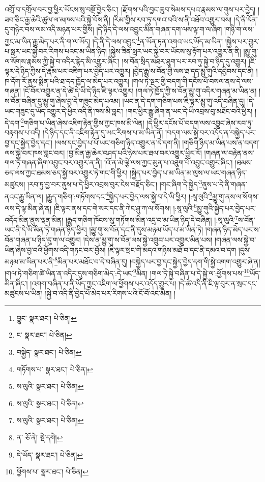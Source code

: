 འགྲོ་བ་དགྲོལ་བར་བྱ་ཕྱིར་ཡོངས་སུ་བསྔོ་བྱེད་ཅིང་། །རྫོགས་པའི་བྱང་ཆུབ་སེམས་དཔའ་རྣམས་ལ་གུས་པར་བྱེད། །ཟབ་ཅིང་རྒྱ་ཆེའི་ཚུལ་ལ་མཁས་པའི་སྐྱེ་བོས་ནི། །རིམ་གྱིས་རབ་ཏུ་དགའ་བའི་ས་ནི་འཐོབ་འགྱུར་བས། །དེ་ནི་དོན་དུ་གཉེར་བས་ལམ་འདི་མཉན་པར་གྱིས། །དེ་ཉིད་དེ་ལས་འབྱུང་མིན་གཞན་དག་ལས་ལྟ་ག་ལ་ཞིག །གཉི་ག་ལས་ཀྱང་མ་ཡིན་རྒྱུ་མེད་པར་ནི་ག་ལ་ཡོད། །དེ་ནི་དེ་ལས་འབྱུང་\footnote{བྱུང་  སྣར་ཐང་།  པེ་ཅིན། }ན་ཡོན་ཏན་འགའ་ཡང་ཡོད་མ་ཡིན། །སྐྱེས་པར་གྱུར་པ་སླར་ཡང་སྐྱེ་བར་རིགས་པའང་མ་ཡིན་ཉིད། །སྐྱེས་ཟིན་སླར་ཡང་སྐྱེ་བར་ཡོངས་སུ་རྟོག་པར་འགྱུར་ན་ནི། །མྱུ་གུ་ལ་སོགས་རྣམས་ཀྱི་སྐྱེ་བ་འདིར་རྙེད་མི་འགྱུར་ཞིང་། །ས་བོན་སྲིད་མཐར་ཐུག་པར་རབ་ཏུ་སྐྱེ་བ་ཉིད་དུ་འགྱུར། །ཇི་ལྟར་དེ་ཉིད་ཀྱིས་དེ་རྣམ་པར་འཇིག་པར་བྱེད་པར་འགྱུར། །བྱེད་རྒྱུ་ས་བོན་གྱི་ལས་ཐ་དད་མྱུ་གུའི་དབྱིབས་དང་ནི། །ཁ་དོག་རོ་ནུས་སྨིན་པའི་ཐ་དད་ཁྱོད་ལ་མེད་པར་འགྱུར། །གལ་ཏེ་སྔར་གྱི་བདག་གི་དངོས་པོ་བསལ་ནས་དེ་ལས་གཞན། །ངོ་བོར་འགྱུར་ན་དེ་ཚེ་དེ་ཡི་དེ་ཉིད་ཇི་ལྟར་འགྱུར། །གལ་ཏེ་ཁྱོད་ཀྱི་ས་བོན་མྱུ་གུ་འདིར་གཞན་མ་ཡིན་ན། །ས་བོན་བཞིན་དུ་མྱུ་གུ་ཞེས་བྱ་དེ་གཟུང་མེད་པའམ། །ཡང་ན་དེ་དག་གཅིག་པས་ཇི་ལྟར་མྱུ་གུ་འདི་བཞིན་དུ། །དེ་ཡང་གཟུང་དུ་ཡོད་འགྱུར་དེ་ཕྱིར་འདི་ནི་ཁས་མི་བླང་། །གང་ཕྱིར་རྒྱུ་ཞིག་ན་ཡང་དེ་ཡི་འབྲས་བུ་མཐོང་བའི་ཕྱིར། །དེ་དག་\footnote{ང་  སྣར་ཐང་།  པེ་ཅིན། }གཅིག་པ་ཡིན་ཞེས་འཇིག་རྟེན་གྱིས་ཀྱང་ཁས་མི་ལེན། །དེ་ཕྱིར་དངོས་པོ་བདག་ལས་འབྱུང་ཞེས་རབ་ཏུ་བརྟགས་པ་འདི། །དེ་ཉིད་དང་ནི་འཇིག་རྟེན་དུ་ཡང་རིགས་པ་མ་ཡིན་ནོ། །བདག་ལས་སྐྱེ་བར་འདོད་ན་བསྐྱེད་པར་བྱ་དང་སྐྱེད་བྱེད་དང་། །ལས་དང་བྱེད་པ་པོ་ཡང་གཅིག་ཉིད་འགྱུར་ན་དེ་དག་ནི། །གཅིག་ཉིད་མ་ཡིན་པས་ན་བདག་ལས་སྐྱེ་བར་ཁས་བླང་བར། །བྱ་མིན་རྒྱ་ཆེར་བཤད་པའི་ཉེས་པར་ཐལ་བར་འགྱུར་ཕྱིར་རོ། །གཞན་ལ་བརྟེན་ནས་གལ་ཏེ་གཞན་ཞིག་འབྱུང་བར་འགྱུར་ན་ནི། །འོ་ན་མེ་ལྕེ་ལས་ཀྱང་མུན་པ་འཐུག་པོ་འབྱུང་འགྱུར་ཞིང་། །ཐམས་ཅད་ལས་ཀྱང་ཐམས་ཅད་སྐྱེ་བར་འགྱུར་ཏེ་གང་གི་ཕྱིར། །སྐྱེད་པར་བྱེད་པ་མ་ཡིན་མ་ལུས་ལ་ཡང་གཞན་ཉིད་མཚུངས། །རབ་ཏུ་བྱ་བར་ནུས་པ་དེ་ཕྱིར་འབྲས་བུར་ངེས་བརྗོད་ཅིང་། །གང་ཞིག་དེ་སྐྱེད་\footnote{བསྐྱེད་  སྣར་ཐང་།  པེ་ཅིན། }ནུས་པ་དེ་ནི་གཞན་ནའང་རྒྱུ་ཡིན་ལ། །རྒྱུད་གཅིག་:གཏོགས་དང་\footnote{གཏོགས་པ་  སྣར་ཐང་།  པེ་ཅིན། }སྐྱེད་པར་བྱེད་ལས་སྐྱེ་བ་དེ་ཡི་ཕྱིར། །:སཱ་ལུའི་\footnote{ས་ལུའི་  སྣར་ཐང་།  པེ་ཅིན། }མྱུ་གུ་ནས་ལ་སོགས་ལས་དེ་ལྟ་མིན་ཞེ་ན། །ཇི་ལྟར་ནས་དང་གེ་སར་དང་ནི་ཀེང་ཤུ་ཀ་ལ་སོགས། །:སཱ་ལུའི་\footnote{ས་ལུའི་  སྣར་ཐང་།  པེ་ཅིན། }མྱུ་གུའི་སྐྱེད་པར་བྱེད་པར་འདོད་མིན་ནུས་ལྡན་མིན། །རྒྱུད་གཅིག་ཁོངས་སུ་གཏོགས་མིན་འདྲ་བ་མ་ཡིན་ཉིད་དེ་བཞིན། །:སཱ་ལུའི་\footnote{ས་ལུའི་  སྣར་ཐང་།  པེ་ཅིན། }ས་བོན་ཡང་ནི་དེ་ཡི་མིན་ཏེ་གཞན་ཉིད་ཕྱིར། །མྱུ་གུ་ས་བོན་དང་ནི་དུས་མཉམ་ཡོད་པ་མ་ཡིན་ཏེ། །གཞན་ཉིད་མེད་པར་ས་བོན་གཞན་པ་ཉིད་དུ་ག་ལ་འགྱུར། །དེས་ན་མྱུ་གུ་ས་བོན་ལས་སྐྱེ་འགྲུབ་པར་འགྱུར་མིན་པས། །གཞན་ལས་སྐྱེ་བ་ཡིན་ཞེས་བྱ་བའི་ཕྱོགས་འདི་གཏང་བར་བྱོས། །ཇི་ལྟར་སྲང་གི་མདའ་གཉིས་མཐོ་བ་དང་ནི་དམའ་བ་དག །དུས་མཉམ་མ་ཡིན་པར་ནི་\footnote{ན་  ཅོ་ནེ།  སྡེ་དགེ། }མིན་པར་མཐོང་བ་དེ་བཞིན་དུ། །བསྐྱེད་པར་བྱ་དང་སྐྱེད་བྱེད་དག་གི་སྐྱེ་འགག་འགྱུར་ཞེ་ན། །གལ་ཏེ་གཅིག་ཚེ་ཡིན་ན་འདིར་དུས་གཅིག་མེད་:དེ་ཡང་\footnote{དེ་ཡོད་  སྣར་ཐང་།  པེ་ཅིན། }མིན། །གལ་ཏེ་སྐྱེ་བཞིན་པ་དེ་སྐྱེ་ལ་:ཕྱོགས་པས་\footnote{ཕྱོགས་པ་  སྣར་ཐང་།  པེ་ཅིན། }ཡོད་མིན་ཞིང་། །འགག་བཞིན་པ་ནི་ཡོད་ཀྱང་འཇིག་ལ་ཕྱོགས་པར་འདོད་གྱུར་པ། །དེ་ཚེ་འདི་ནི་ཇི་ལྟ་བུར་ན་སྲང་དང་མཚུངས་པ་ཡིན། །སྐྱེ་བ་འདི་ནི་བྱེད་པོ་མེད་པར་རིགས་པའི་ངོ་བོ་འང་མིན། །
